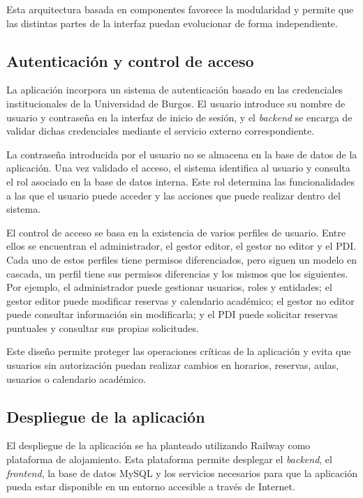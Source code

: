 Esta arquitectura basada en componentes favorece la modularidad y permite que las distintas partes de la interfaz puedan evolucionar de forma independiente.

\subsection{Autenticación y control de acceso}

La aplicación incorpora un sistema de autenticación basado en las credenciales institucionales de la Universidad de Burgos. El usuario introduce su nombre de usuario y contraseña en la interfaz de inicio de sesión, y el \textit{backend} se encarga de validar dichas credenciales mediante el servicio externo correspondiente.

La contraseña introducida por el usuario no se almacena en la base de datos de la aplicación. Una vez validado el acceso, el sistema identifica al usuario y consulta el rol asociado en la base de datos interna. Este rol determina las funcionalidades a las que el usuario puede acceder y las acciones que puede realizar dentro del sistema.

El control de acceso se basa en la existencia de varios perfiles de usuario. Entre ellos se encuentran el administrador, el gestor editor, el gestor no editor y el PDI. Cada uno de estos perfiles tiene permisos diferenciados, pero siguen un modelo en cascada, un perfil tiene sus permisos diferencias y los mismos que los siguientes. Por ejemplo, el administrador puede gestionar usuarios, roles y entidades; el gestor editor puede modificar reservas y calendario académico; el gestor no editor puede consultar información sin modificarla; y el PDI puede solicitar reservas puntuales y consultar sus propias solicitudes.

Este diseño permite proteger las operaciones críticas de la aplicación y evita que usuarios sin autorización puedan realizar cambios en horarios, reservas, aulas, usuarios o calendario académico.

\subsection{Despliegue de la aplicación}

El despliegue de la aplicación se ha planteado utilizando Railway como plataforma de alojamiento. Esta plataforma permite desplegar el \textit{backend}, el \textit{frontend}, la base de datos MySQL y los servicios necesarios para que la aplicación pueda estar disponible en un entorno accesible a través de Internet.

